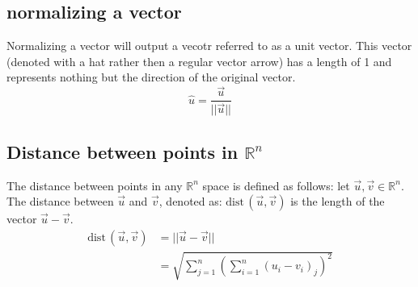 \documentclass[11pt, a4paper]{article}
\newcommand*{\R}{\ensuremath{\mathbb{R}}}
\begin{document}
\subsection{normalizing a vector}
Normalizing a vector will output a vecotr referred to as a unit vector. This vector (denoted with a hat rather then a regular vector arrow) has a length of 1 and represents nothing but the direction of the original vector.
\begin{equation}
  \hat{u} = \frac{\vec{u}}{||\vec{u}||}
\end{equation}

\subsection{Distance between points in $\R^n$}
The distance between points in any $\R^n$ space is defined as follows:
let $\vec{u}, \vec{v} \in \R^n$. The distance between $\vec{u}$ and $\vec{v}$, denoted as: $\text{dist}\,(\vec{u}, \vec{v})$ is the length of the vector $\vec{u} - \vec{v}$.
\begin{align}
  \text{dist}\,(\vec{u}, \vec{v}) &= ||\vec{u} - \vec{v}||\\
                                  &= \sqrt{\sum_{j=1}^n(\sum_{i=1}^n(u_i-v_i)_j)^2}
\end{align}
\end{document}
